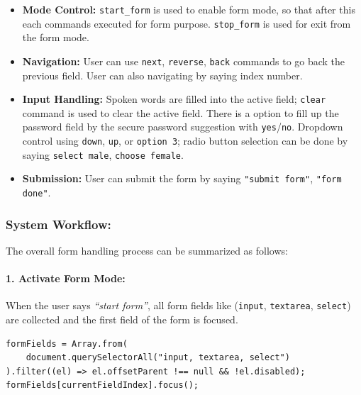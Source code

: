 \begin{itemize}
    \item \textbf{Mode Control:} \texttt{start_form} is used to enable form mode, so that after this each commands executed for form purpose. \texttt{stop_form} is used for exit from the form mode.
    \item \textbf{Navigation:} User can use \texttt{next}, \texttt{reverse}, \texttt{back} commands to go back the previous field. User can also navigating by saying index number.
    \item \textbf{Input Handling:} Spoken words are filled into the active field; \texttt{clear} command is used to clear the active field. There is a option to fill up the password field by the secure password suggestion with \texttt{yes}/\texttt{no}. Dropdown control using \texttt{down}, \texttt{up}, or \texttt{option 3}; radio button selection can be done by saying \texttt{select male}, \texttt{choose female}.
    \item \textbf{Submission:} User can submit the form by saying \texttt{"submit form"}, \texttt{"form done"}.
\end{itemize}

\subsubsection*{System Workflow:}

The overall form handling process can be summarized as follows:
\paragraph{1. Activate Form Mode:}
When the user says \textit{``start form''}, all form fields like (\texttt{input}, \texttt{textarea}, \texttt{select}) are collected and the first field of the form is focused.

\begin{verbatim}
formFields = Array.from(
    document.querySelectorAll("input, textarea, select")
).filter((el) => el.offsetParent !== null && !el.disabled);
formFields[currentFieldIndex].focus();
\end{verbatim}

